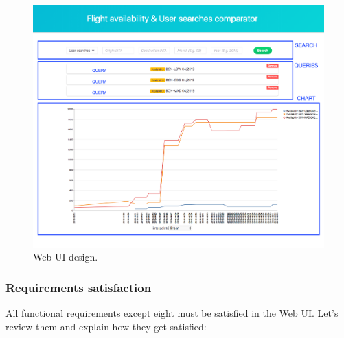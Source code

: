 \begin{figure}[H]
\centering
\includegraphics[scale=0.29]{resources/website-design.png}
\caption{Web UI design.}
\end{figure}

\subsubsection*{Requirements satisfaction}

All functional requirements except eight must be satisfied in the Web UI. Let's review them and explain how they get satisfied:

